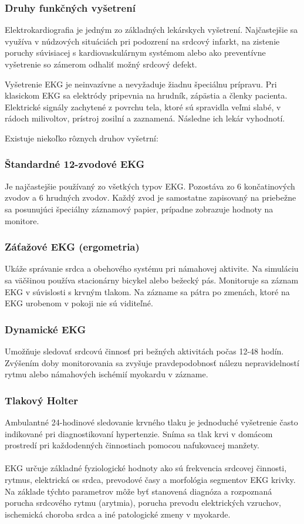 \documentclass[titlepage,12pt]{article}
\begin{document}
\subsubsection{Druhy funkčných vyšetrení}
Elektrokardiografia je jedným zo základných lekárskych vyšetrení. Najčastejšie sa využíva v núdzových situáciách pri podozrení na srdcový infarkt, na zistenie poruchy súvisiacej s kardiovaskulárnym systémom alebo ako preventívne vyšetrenie so zámerom odhaliť možný srdcový defekt.

Vyšetrenie EKG je neinvazívne a nevyžaduje žiadnu špeciálnu prípravu. Pri klasickom EKG sa elektródy pripevnia na hrudník, zápästia a členky pacienta. Elektrické signály zachytené z povrchu tela, ktoré sú spravidla veľmi slabé, v rádoch milivoltov, prístroj zosilní a zaznamená. Následne ich lekár vyhodnotí.

Existuje niekoľko rôznych druhov vyšetrní:
\subsubsection*{Štandardné 12-zvodové EKG}
Je najčastejšie používaný zo všetkých typov EKG. Pozostáva zo 6 končatinových zvodov a 6 hrudných zvodov. Každý zvod je samostatne zapisovaný na priebežne sa posunujúci špeciálny záznamový papier, prípadne zobrazuje hodnoty na monitore.
\subsubsection*{Záťažové EKG (ergometria)}
Ukáže správanie srdca a obehového systému pri námahovej aktivite. Na simuláciu sa väčšinou používa stacionárny bicykel alebo bežecký pás. Monitoruje sa záznam EKG v súvislosti s krvným tlakom. Na zázname sa pátra po zmenách, ktoré na EKG urobenom v pokoji nie sú viditeľné.
\subsubsection*{Dynamické EKG}
Umožňuje sledovať srdcovú činnosť pri bežných aktivitách počas 12-48 hodín. Zvýšením doby monitorovania sa zvyšuje pravdepodobnosť nálezu nepravidelností rytmu alebo námahových ischémií myokardu v zázname.
\subsubsection*{Tlakový Holter}
Ambulantné 24-hodinové sledovanie krvného tlaku je jednoduché vyšetrenie často indikované pri diagnostikovaní hypertenzie. Sníma sa tlak krvi v domácom prostredí pri každodenných činnostiach pomocou nafukovacej manžety.
\\
\\
EKG určuje základné fyziologické hodnoty ako sú frekvencia srdcovej činnosti, rytmus, elektrická os srdca, prevodové časy a morfológia segmentov EKG krivky. Na základe týchto parametrov môže byť stanovená diagnóza a rozpoznaná porucha srdcového rytmu (arytmia), porucha prevodu elektrických vzruchov, ischemická choroba srdca a iné patologické zmeny v myokarde.
\end{document}
